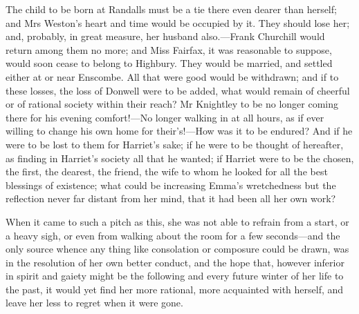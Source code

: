 The child to be born at Randalls must be a tie there even dearer than herself; and Mrs Weston's heart and time would be occupied by it. They should lose her; and, probably, in great measure, her husband also.—Frank Churchill would return among them no more; and Miss Fairfax, it was reasonable to suppose, would soon cease to belong to Highbury. They would be married, and settled either at or near Enscombe. All that were good would be withdrawn; and if to these losses, the loss of Donwell were to be added, what would remain of cheerful or of rational society within their reach? Mr Knightley to be no longer coming there for his evening comfort!—No longer walking in at all hours, as if ever willing to change his own home for their's!—How was it to be endured? And if he were to be lost to them for Harriet's sake; if he were to be thought of hereafter, as finding in Harriet's society all that he wanted; if Harriet were to be the chosen, the first, the dearest, the friend, the wife to whom he looked for all the best blessings of existence; what could be increasing Emma's wretchedness but the reflection never far distant from her mind, that it had been all her own work?

When it came to such a pitch as this, she was not able to refrain from a start, or a heavy sigh, or even from walking about the room for a few seconds—and the only source whence any thing like consolation or composure could be drawn, was in the resolution of her own better conduct, and the hope that, however inferior in spirit and gaiety might be the following and every future winter of her life to the past, it would yet find her more rational, more acquainted with herself, and leave her less to regret when it were gone.